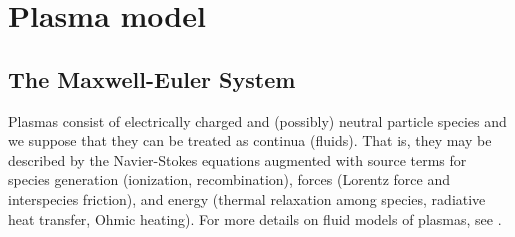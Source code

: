 \documentclass{article}
\begin{document}
\section{Plasma model} \label{sec:plasma-model}

\subsection{The Maxwell-Euler System}

Plasmas consist of electrically charged and (possibly) neutral particle species and we
suppose that they can be treated as continua (fluids). That is, they may be described by the
Navier-Stokes equations augmented with source terms for species generation (ionization,
recombination), forces (Lorentz force and interspecies friction), and energy (thermal
relaxation among species, radiative heat transfer, Ohmic heating). For more details on
fluid models of plasmas, see \cite{chen2016, remi_2014}.
\end{document}
